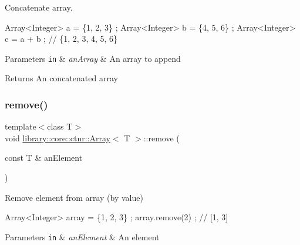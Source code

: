 Concatenate array. 


\begin{DoxyCode}
Array<Integer> a = \{1, 2, 3\} ;
Array<Integer> b = \{4, 5, 6\} ;
Array<Integer> c = a + b ; \textcolor{comment}{// \{1, 2, 3, 4, 5, 6\}}
\end{DoxyCode}



\begin{DoxyParams}[1]{Parameters}
\mbox{\tt in}  & {\em an\+Array} & An array to append \\
\hline
\end{DoxyParams}
\begin{DoxyReturn}{Returns}
An concatenated array 
\end{DoxyReturn}
\mbox{\label{classlibrary_1_1core_1_1ctnr_1_1_array_a8e295703797d6e41dad7a45e4101a6db}} 
\subsubsection{\texorpdfstring{remove()}{remove()}\hspace{0.1cm}{\footnotesize\ttfamily [1/2]}}
{\footnotesize\ttfamily template$<$class T$>$ \\
void \hyperlink{classlibrary_1_1core_1_1ctnr_1_1_array}{library\+::core\+::ctnr\+::\+Array}$<$ T $>$\+::remove (\begin{DoxyParamCaption}\item[{const T \&}]{an\+Element }\end{DoxyParamCaption})}



Remove element from array (by value) 


\begin{DoxyCode}
Array<Integer> array = \{1, 2, 3\} ;
array.remove(2) ; \textcolor{comment}{// [1, 3]}
\end{DoxyCode}



\begin{DoxyParams}[1]{Parameters}
\mbox{\tt in}  & {\em an\+Element} & An element \\
\hline
\end{DoxyParams}
\mbox{\label{classlibrary_1_1core_1_1ctnr_1_1_array_ab37ca6fc14eefd1336544e05ba1b4d0e}} 
